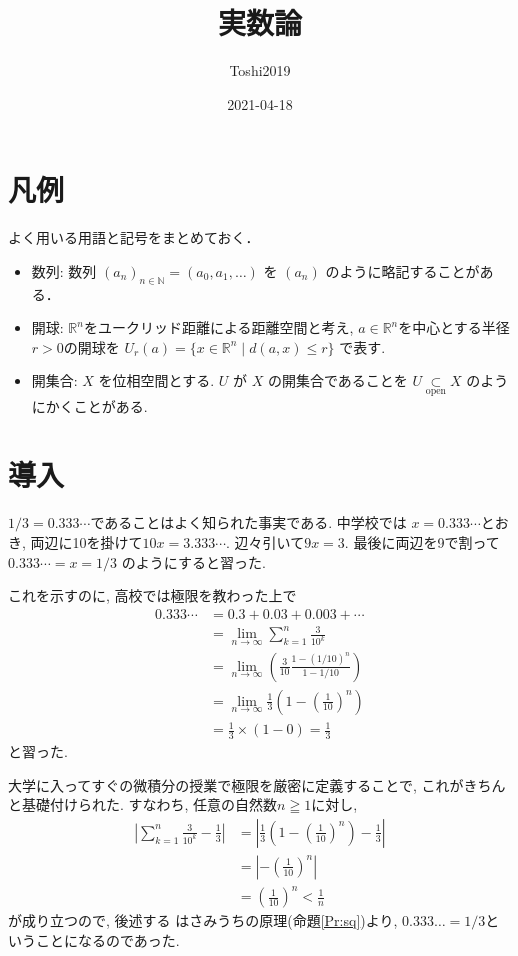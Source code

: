 \documentclass[11pt, a4paper, dvipdfmx]{jsarticle}
\title{実数論}
\author{Toshi2019}
\date{2021-04-18}
\theoremstyle{definition}
\newcommand{\N}{\mathbb{N}}
\newcommand{\R}{\mathbb{R}}
\numberwithin{equation}{section} %
\begin{document}
\maketitle

\begin{abstract}
\end{abstract}
\section{凡例}

よく用いる用語と記号をまとめておく．
\begin{itemize}
  \item 数列: 
  数列 $(a_n)_{n\in\N} = (a_0,a_1,\dots)$ を 
  $(a_n)$ のように略記することがある．
  \item 開球: 
  ${\R}^n$をユークリッド距離による距離空間と考え, 
  $a\in{\R}^n$を中心とする半径$r > 0$の開球を
  $U_r(a) = \{x\in{\R}^n\mid d(a,x)\le r\}$
  で表す. 
  \item 開集合: 
  $X$ を位相空間とする. $U$ が $X$ の開集合であることを
  $U\underset{\text{open}}{\subset}X$ のようにかくことがある. 
\end{itemize}

\section{導入}

$1/3 = 0.333\cdots$であることはよく知られた事実である. 中学校では
$x = 0.333\cdots$とおき, 両辺に10を掛けて$10x = 3.333\cdots$. 
辺々引いて$9x = 3$. 最後に両辺を9で割って$0.333\cdots = x = 1/3$
のようにすると習った. 

これを示すのに, 高校では極限を教わった上で
\begin{align*}
  0.333\cdots 
  &= 0.3 + 0.03 + 0.003 + \cdots\\
  &= \lim_{n\to\infty}\sum_{k=1}^{n}\frac{3}{10^k}\\
  &= \lim_{n\to\infty}\left(\frac{3}{10}
  \frac{1-(1/10)^n}{1-1/10} \right)\\
  &= \lim_{n\to\infty}\frac{1}{3}
  \left(1-\left(\frac{1}{10}\right)^n\right)\\
  &= \frac{1}{3}\times(1-0) = \frac{1}{3}
\end{align*}
と習った. 

大学に入ってすぐの微積分の授業で極限を厳密に定義することで, 
これがきちんと基礎付けられた. すなわち, 任意の自然数$n\geqq1$に対し, 
\begin{align*}
  \left|\sum_{k=1}^{n}\frac{3}{10^k} - \frac{1}{3}\right| 
  &= \left|\frac{1}{3}
  \left(1-\left(\frac{1}{10}\right)^n\right)
  - \frac{1}{3}\right|\\
  &= \left|-\left(\frac{1}{10}\right)^n\right|\\
  &= \left(\frac{1}{10}\right)^n < \frac{1}{n}
\end{align*}
が成り立つので, 後述する
はさみうちの原理(命題\ref{Pr:sq})より, 
$0.333\dots=1/3$ということになるのであった. 
\end{document}
